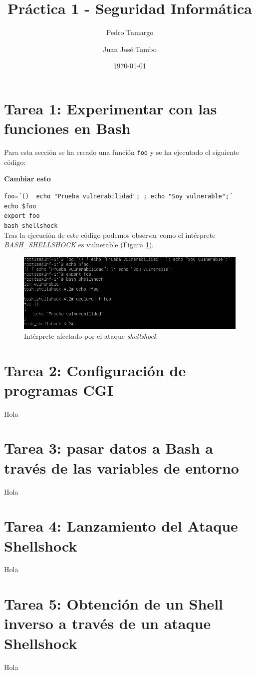 \documentclass[10pt,a4paper]{article}
\begin{document}
\begin{titlepage}
\title{{\Huge Práctica 1 - Seguridad Informática}}
\author{Pedro Tamargo \and Juan José Tambo}
\date{\today}
\clearpage\maketitle
\thispagestyle{empty}
\tableofcontents
\end{titlepage}

\section{Tarea 1: Experimentar con las funciones en Bash}

Para esta sección se ha creado una función \texttt{foo} y se ha ejecutado el siguiente código:\\

\begin{Huge}
\textbf{Cambiar esto}
\end{Huge}
\texttt{foo=´() { echo "Prueba vulnerabilidad"; }; echo "Soy vulnerable";´}\\
\texttt{echo \${}foo}\\
\texttt{export foo}\\
\texttt{bash\_{}shellshock}\\

Tras la ejecución de este código podemos observar como el intérprete \emph{BASH\_{}SHELLSHOCK} es vulnerable (Figura \ref{fig:tarea1_shellshock}).

\begin{figure}[h!]
\centering
\includegraphics[scale=0.3]{images/Tarea_1.png}
\caption{Intérprete afectado por el ataque \emph{shellshock}}
\label{fig:tarea1_shellshock} 
\end{figure}

\section{Tarea 2: Configuración de programas CGI}

Hola

\section{Tarea 3: pasar datos a Bash a través de las variables de entorno}

Hola

\section{Tarea 4: Lanzamiento del Ataque Shellshock}

Hola

\section{Tarea 5: Obtención de un Shell inverso a través de un ataque Shellshock}

Hola
\end{document}
